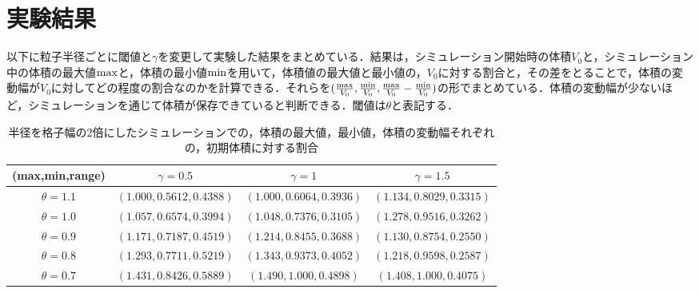 \documentclass[a4j,12pt]{jreport}
\begin{document}
\section{実験結果} \label{sec:exp_result}
以下に粒子半径ごとに閾値と$\gamma$を変更して実験した結果をまとめている．結果は，シミュレーション開始時の体積$V_0$と，シミュレーション中の体積の最大値$\rm{max}$と，体積の最小値$\rm{min}$を用いて，体積値の最大値と最小値の，$V_0$に対する割合と，その差をとることで，体積の変動幅が$V_0$に対してどの程度の割合なのかを計算できる．それらを$ (\frac{\rm{max}}{V_0},\frac{\rm{min}}{V_0},\frac{\rm{max}}{V_0}-\frac{\rm{min}}{V_0}) $の形でまとめている．体積の変動幅が少ないほど，シミュレーションを通じて体積が保存できていると判断できる．閾値は$\theta$と表記する．
\begin{table}[H]
    \centering
    \caption{半径を格子幅の2倍にしたシミュレーションでの，体積の最大値，最小値，体積の変動幅それぞれの，初期体積に対する割合} \label{table:r2dx}
    \begin{tabular}{|c|c|c|c|}
    \hline
    	(max,min,range) & $\gamma = 0.5$	 	& $\gamma =1$ 	 & $\gamma =1.5$ 		\\\hline\hline
     $\theta = 1.1$        & $ (1.000,0.5612,0.4388) $ & $ (1.000,0.6064,0.3936) $ & $ (1.134,0.8029,0.3315) $ 			\\
     $\theta = 1.0$   	 & $ (1.057,0.6574,0.3994) $ & $ (1.048,0.7376,0.3105) $ & $ (1.278,0.9516,0.3262) $        \\
     $\theta = 0.9$  	 & $ (1.171,0.7187,0.4519) $ & $ (1.214,0.8455,0.3688) $ & $ (1.130,0.8754,0.2550) $     \\
     $\theta = 0.8$      & $ (1.293,0.7711,0.5219) $ & $ (1.343,0.9373,0.4052) $ & $ (1.218,0.9598,0.2587) $ \\                
     $\theta = 0.7$      & $ (1.431,0.8426,0.5889) $ & $ (1.490,1.000,0.4898) $ & $ (1.408,1.000,0.4075) $ \\ \hline
    \end{tabular}
  \end{table}
  
\end{document}
